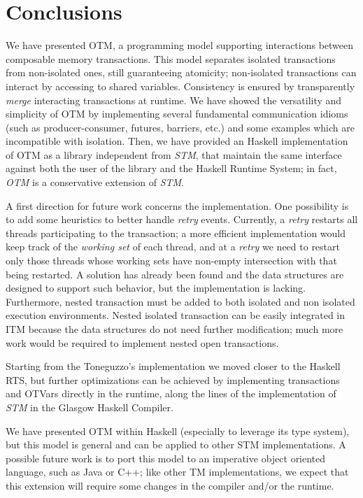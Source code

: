 
\chapter{Conclusions}
\label{chap:conc}

We have presented OTM, a programming model supporting  interactions between composable memory transactions.
This model separates isolated transactions from non-isolated ones, still guaranteeing atomicity; non-isolated transactions can interact by accessing to shared variables.
Consistency is ensured by transparently \emph{merge} interacting transactions at runtime.  
We have showed the versatility and simplicity of OTM by implementing several fundamental communication idioms (such as producer-consumer, futures, barriers, etc.) and some examples which are incompatible with isolation.
Then, we have provided an Haskell implementation of OTM as a library independent from \emph{STM}, that maintain the same interface against both the user of the library and the Haskell Runtime System; in fact, \emph{OTM} is a conservative extension of \emph{STM}.

A first direction for future work concerns the implementation.
One possibility is to add some heuristics to better handle \emph{retry} events.
Currently, a \emph{retry} restarts all threads participating to the transaction; a more efficient implementation would keep track of the \emph{working set} of each thread, and at a \emph{retry} we need to restart only those threads whose working sets have non-empty intersection with that being restarted.
A solution has already been found and the data structures are designed to support such behavior, but the implementation is lacking.
Furthermore, nested transaction must be added to both isolated and non isolated execution environments.
Nested isolated transaction can be easily integrated in ITM because the data structures do not need further modification; much more work would be required to implement nested open transactions.

Starting from the Toneguzzo's implementation we moved closer to the Haskell RTS, but further optimizations can be achieved by implementing transactions and OTVars directly in the runtime, along the lines of the implementation of \emph{STM} in the Glasgow Haskell Compiler.

We have presented OTM within Haskell (especially to leverage its type system), but this model is general and can be applied to other STM implementations. A possible future work is to port this model to an imperative object oriented language, such as Java or C++; like other TM implementations, we expect that this extension will require some changes in the compiler and/or the runtime. 
